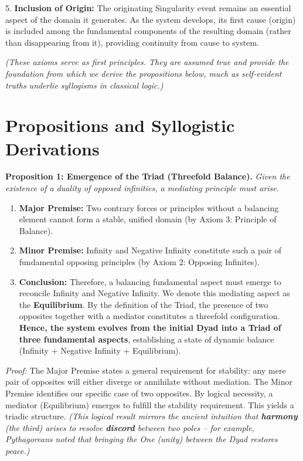 \documentclass[11pt]{article}
\theoremstyle{plain}
\begin{document}
5. \textbf{Inclusion of Origin:} The originating Singularity event remains an essential aspect of the domain it generates. As the system develops, its first cause (origin) is included among the fundamental components of the resulting domain (rather than disappearing from it), providing continuity from cause to system.

\textit{(These axioms serve as first principles. They are assumed true and provide the foundation from which we derive the propositions below, much as self-evident truths underlie syllogisms in classical logic.)}

\section{Propositions and Syllogistic Derivations}

\textbf{Proposition 1: Emergence of the Triad (Threefold Balance).} \textit{Given the existence of a duality of opposed infinities, a mediating principle must arise.}

\begin{enumerate}
    \item \textbf{Major Premise:} Two contrary forces or principles without a balancing element cannot form a stable, unified domain (by Axiom 3: Principle of Balance).
    \item \textbf{Minor Premise:} Infinity and Negative Infinity constitute such a pair of fundamental opposing principles (by Axiom 2: Opposing Infinites).    
    \item \textbf{Conclusion:} Therefore, a balancing fundamental aspect must emerge to reconcile Infinity and Negative Infinity. We denote this mediating aspect as the \textbf{Equilibrium}. By the definition of the Triad, the presence of two opposites together with a mediator constitutes a threefold configuration. \textbf{Hence, the system evolves from the initial Dyad into a Triad of three fundamental aspects}, establishing a state of dynamic balance (Infinity + Negative Infinity + Equilibrium).
\end{enumerate}

\textit{Proof:} The Major Premise states a general requirement for stability: any mere pair of opposites will either diverge or annihilate without mediation. The Minor Premise identifies our specific case of two opposites. By logical necessity, a mediator (Equilibrium) emerges to fulfill the stability requirement. This yields a triadic structure. \textit{(This logical result mirrors the ancient intuition that \textbf{harmony} (the third) arises to resolve \textbf{discord} between two poles – for example, Pythagoreans noted that bringing the One (unity) between the Dyad restores peace.)}
\end{document}
